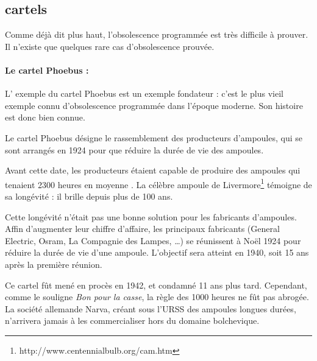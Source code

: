 \subsection{cartels}



Comme déjà dit plus haut, l'obsolescence programmée est très difficile à prouver. Il n'existe que quelques rare cas d'obsolescence prouvée. 

\paragraph*{Le cartel Phoebus : } L' exemple du cartel Phoebus est un exemple fondateur : c'est le plus vieil exemple connu d'obsolescence programmée dans l'époque moderne. Son histoire est donc bien connue. 

Le cartel Phoebus désigne le rassemblement des producteurs d'ampoules, qui se sont arrangés en 1924 pour que réduire la durée de vie des ampoules. 

Avant cette date, les producteurs étaient capable de produire des ampoules qui tenaient 2300 heures en moyenne \cite{opes_PHOEBUS}. La célèbre ampoule de Livermore\footnote{http://www.centennialbulb.org/cam.htm} témoigne de sa longévité : il brille depuis plus de 100 ans. 

Cette longévité n'était pas une bonne solution pour les fabricants d'ampoules. Affin d'augmenter leur chiffre d'affaire,  les principaux fabricants (General Electric, Osram, La Compagnie des Lampes, \dots) se réunissent à Noël 1924 pour réduire la durée de vie d'une ampoule. L'objectif sera atteint  en 1940, soit 15 ans après la première réunion. 

Ce cartel fût mené en procès en 1942, et condamné 11 ans plus tard. Cependant, comme le souligne \textit{Bon pour la casse}, la règle des 1000 heures ne fût pas abrogée. La société allemande Narva, créant sous l'URSS des ampoules longues durées, n'arrivera jamais à les commercialiser hors du domaine bolchevique. 

\item